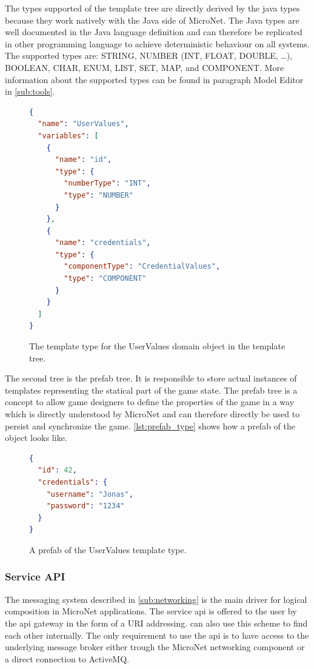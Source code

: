 The types supported of the template tree are directly derived by the java types
because they work natively with the Java side of MicroNet. The Java types are
well documented in the Java language definition and can therefore be replicated
in other programming language to achieve deterministic behaviour on all systems.
The supported types are: STRING, NUMBER (INT, FLOAT, DOUBLE, \ldots), BOOLEAN, CHAR,
ENUM, LIST, SET, MAP, and COMPONENT. More information about the supported types
can be found in paragraph Model Editor in \autoref{sub:tools}.

\begin{figure}
\begin{lstlisting}[language=json,firstnumber=1] 
{
  "name": "UserValues",
  "variables": [
    {
      "name": "id",
      "type": {
        "numberType": "INT",
        "type": "NUMBER"
      }
    },
    {
      "name": "credentials",
      "type": {
        "componentType": "CredentialValues",
        "type": "COMPONENT"
      }
    }
  ]
}
\end{lstlisting}
\caption{The template type for the UserValues domain object in the template
tree.}
\label{lst:template_type}
\end{figure}

The second tree is the prefab tree. It is responsible to store actual instances
of templates representing the statical part of the game state. The prefab tree
is a concept to allow game designers to define the properties of the game in a
way which is directly understood by MicroNet and can therefore directly be used
to persist and synchronize the game. \autoref{lst:prefab_type} shows how a
prefab of the  object looks like.

\begin{figure}
\begin{lstlisting}[language=json,firstnumber=1] 
{
  "id": 42,
  "credentials": {
    "username": "Jonas",
    "password": "1234"
  }
}
\end{lstlisting}
\caption{A prefab of the UserValues template type.}
\label{lst:prefab_type}
\end{figure}



\subsubsection{Service API}

The messaging system described in \autoref{sub:networking} is the main driver
for logical composition in MicroNet applications. The service \gls{api} is
offered to the user by the \gls{api} gateway in the form of a URI addressing. \mss{}
can also use this scheme to find each other internally. The only requirement to
use the \gls{api} is to have access to the underlying message broker either trough the
MicroNet networking component or a direct connection to ActiveMQ.

